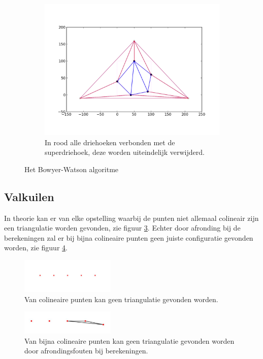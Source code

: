 \begin{figure}
\begin{subfigure}{0.4\textwidth}
		\includegraphics[width=\textwidth]{img/bowyer-watson_verwijderen}
		\caption{In rood alle driehoeken verbonden met de superdriehoek, deze worden uiteindelijk verwijderd.}
		\label{bowyer-watson-c}
	\end{subfigure}
	\caption{Het Bowyer-Watson algoritme \cite{Bowyer-WatsonWiki}}
	\label{bowyer-watson}
\end{figure}

\subsection{Valkuilen}
In theorie kan er van elke opstelling waarbij de punten niet allemaal colineair zijn een triangulatie worden gevonden, zie figuur \ref{colineair}. Echter door afronding bij de berekeningen zal er bij bijna colineaire punten geen juiste  configuratie gevonden worden, zie figuur \ref{almost_colineair}. 

\begin{figure}
	\center
	\includegraphics[width=0.4\textwidth]{img/colineair}
	\caption{Van colineaire punten kan geen triangulatie gevonden worden.}
	\label{colineair}
\end{figure}
\begin{figure}
	\center
	\includegraphics[width=0.4\textwidth]{img/almost_colinair}
	\caption{Van bijna colineaire punten kan geen triangulatie gevonden worden door afrondingsfouten bij berekeningen.}
	\label{almost_colineair}
\end{figure}
